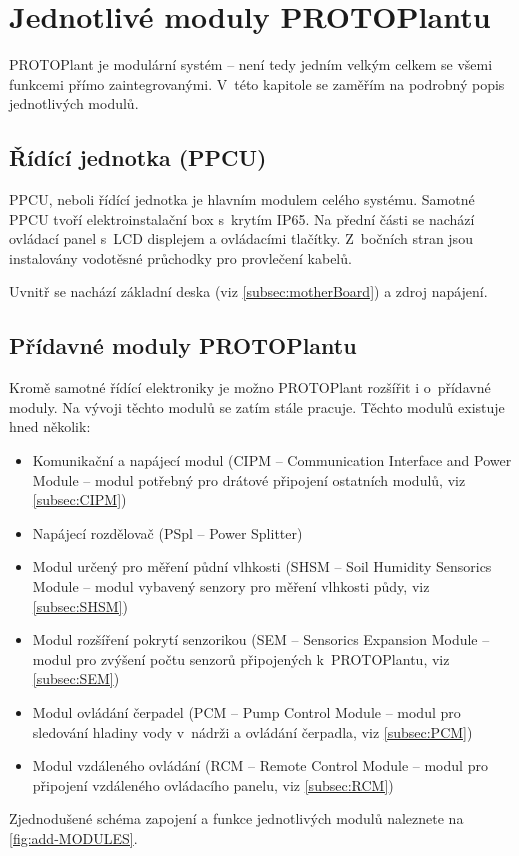 \chapter{Jednotlivé moduly PROTOPlantu}
PROTOPlant je modulární systém -- není tedy jedním velkým celkem se všemi funkcemi přímo zaintegrovanými.
V~této kapitole se zaměřím na podrobný popis jednotlivých modulů.

\section{Řídící jednotka (PPCU)}
PPCU, neboli řídící jednotka je hlavním modulem celého systému.
Samotné PPCU tvoří elektroinstalační box s~krytím IP65.
Na přední části se nachází ovládací panel s~LCD displejem a ovládacími tlačítky.
Z~bočních stran jsou instalovány vodotěsné průchodky pro provlečení kabelů.

Uvnitř se nachází základní deska (viz \autoref{subsec:motherBoard}) a zdroj napájení.

\section{Přídavné moduly PROTOPlantu}
Kromě samotné řídící elektroniky je možno PROTOPlant rozšířit i o~přídavné moduly. 
Na vývoji těchto modulů se zatím stále pracuje.
Těchto modulů existuje hned několik:

\begin{itemize}
    \item Komunikační a napájecí modul (CIPM -- Communication Interface and Power Module -- modul potřebný pro drátové připojení ostatních modulů, viz \autoref{subsec:CIPM})
    \item Napájecí rozdělovač (PSpl -- Power Splitter)
    \item Modul určený pro měření půdní vlhkosti (SHSM -- Soil Humidity Sensorics Module -- modul vybavený senzory pro měření vlhkosti půdy, viz \autoref{subsec:SHSM})
    \item Modul rozšíření pokrytí senzorikou (SEM -- Sensorics Expansion Module -- modul pro zvýšení počtu senzorů připojených k~PROTOPlantu, viz \autoref{subsec:SEM})
    \item Modul ovládání čerpadel (PCM -- Pump Control Module -- modul pro sledování hladiny vody v~nádrži a ovládání čerpadla, viz \autoref{subsec:PCM})
    \item Modul vzdáleného ovládání (RCM -- Remote Control Module -- modul pro připojení vzdáleného ovládacího panelu, viz \autoref{subsec:RCM})
\end{itemize}
Zjednodušené schéma zapojení a funkce jednotlivých modulů naleznete na \autoref{fig:add-MODULES}.

